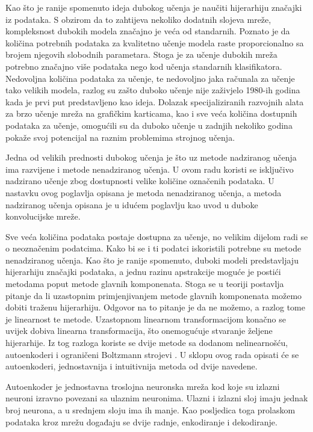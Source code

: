 \documentclass[lmodern, utf8, diplomski, numeric]{fer}
\begin{document}
Kao što je ranije spomenuto ideja dubokog učenja je naučiti hijerarhiju značajki iz podataka. S obzirom da to zahtijeva nekoliko dodatnih slojeva mreže, kompleksnost dubokih modela značajno je veća od standarnih. Poznato je da količina potrebnih podataka za kvalitetno učenje modela raste proporcionalno sa brojem njegovih slobodnih parametara. Stoga je za učenje dubokih mreža potrebno značajno više podataka nego kod učenja standarnih klasifikatora. Nedovoljna količina podataka za učenje, te nedovoljno jaka računala za učenje tako velikih modela, razlog su zašto duboko učenje nije zaživjelo 1980-ih godina kada je prvi put predstavljeno kao ideja. Dolazak specijaliziranih razvojnih alata za brzo učenje mreža na grafičkim karticama, kao i sve veća količina dostupnih podataka za učenje, omogućili su da duboko učenje u zadnjih nekoliko godina pokaže svoj potencijal na raznim problemima strojnog učenja.

Jedna od velikih prednosti dubokog učenja je što uz metode nadziranog učenja ima razvijene i metode nenadziranog učenja. U ovom radu koristi se isključivo nadzirano učenje zbog dostupnosti velike količine označenih podataka. U nastavku ovog poglavlja opisana je metoda nenadziranog učenja, a metoda nadziranog učenja opisana je u idućem poglavlju kao uvod u duboke konvolucijske mreže.

Sve veća količina podataka postaje dostupna za učenje, no velikim dijelom radi se o neoznačenim podatcima. Kako bi se i ti podatci iskoristili potrebne su metode nenadziranog učenja. Kao što je ranije spomenuto, duboki modeli predstavljaju hijerarhiju značajki podataka, a jednu razinu apstrakcije moguće je postići metodama poput metode glavnih komponenata. Stoga se u teoriji postavlja pitanje da li uzastopnim primjenjivanjem metode glavnih komponenata možemo dobiti traženu hijerarhiju. Odgovor na to pitanje je da ne možemo, a razlog tome je linearnost te metode. Uzastopnom linearnom transformacijom konačno se uvijek dobiva linearna transformacija, što onemogućuje stvaranje željene hijerarhije. Iz tog razloga koriste se dvije metode sa dodanom nelinearnošću, autoenkoderi  i ograničeni Boltzmann strojevi  \cite{bengio2009auto}\cite{hinton2006rbm}. U sklopu ovog rada opisati će se autoenkoderi, jednostavnija i intuitivnija metoda od dvije navedene.

Autoenkoder je jednostavna troslojna neuronska mreža kod koje su izlazni neuroni izravno povezani sa ulaznim neuronima. Ulazni i izlazni sloj imaju jednak broj neurona, a u srednjem sloju ima ih manje. Kao posljedica toga prolaskom podataka kroz mrežu događaju se dvije radnje, enkodiranje i dekodiranje. 
\end{document}
